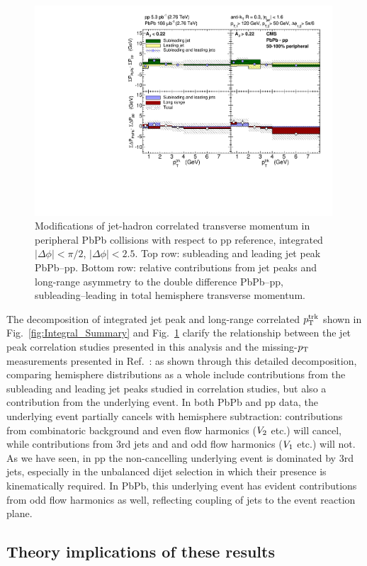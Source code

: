 \begin{figure}[hbt]
\begin{center} 
\includegraphics[width=0.99\textwidth]{figures/Results/Integral_PbPb_pp_Summary_Peripheral.pdf}
\caption[Relative contributions from jet peaks and long-range asymmetry to the double difference PbPb--pp, subleading--leading in total hemisphere transverse momentum for peripheral collisions]{Modifications of jet-hadron correlated transverse momentum in peripheral PbPb collisions with respect to pp reference, integrated $|\Delta\phi| < \pi/2$, $|\Delta\phi| < 2.5$.  Top row:  subleading and leading jet peak PbPb--pp.  Bottom row:  relative contributions from jet peaks and long-range asymmetry to the double difference PbPb--pp, subleading--leading in total hemisphere transverse momentum. }
\label{fig:Integral_Summary_Peripheral} 
\end{center} 
\end{figure} 


The decomposition of integrated jet peak and long-range correlated $p_{\rm T}^{\rm trk}$ shown in Fig.~\ref{fig:Integral_Summary} and Fig.~\ref{fig:Integral_Summary_Peripheral} clarify the relationship between the jet peak correlation studies presented in this analysis and the missing-$p_{\rm T}$ measurements presented in Ref.~\cite{HIN_2014_010}:  as shown through this detailed decomposition, comparing hemisphere distributions as a whole include contributions from the subleading and leading jet peaks studied in correlation studies, but also a contribution from the underlying event.  In both PbPb and pp data, the underlying event partially cancels with hemisphere subtraction:  contributions from combinatoric background and even flow harmonics ($V_{\rm 2}$ etc.) will cancel, while contributions from 3rd jets and and odd flow harmonics ($V_{\rm 1}$ etc.) will not.  As we have seen, in pp the non-cancelling underlying event is dominated by 3rd jets, especially in the unbalanced dijet selection in which their presence is kinematically required.  In PbPb, this underlying event has evident contributions from odd flow harmonics as well, reflecting coupling of jets to the event reaction plane.  



\clearpage


\subsection{Theory implications of these results}